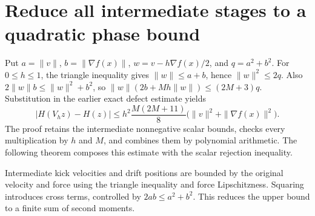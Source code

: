\documentclass[11pt,a4paper]{article}
\begin{document}
\section{\texorpdfstring{Reduce all intermediate stages to a quadratic phase bound}{Reduce all intermediate stages to a quadratic phase bound}}


Put \(a=\|v\|\), \(b=\|\nabla f(x)\|\), \(w=v-h\nabla f(x)/2\), and \(q=a^2+b^2\). For \(0\le h\le1\), the triangle inequality gives \(\|w\|\le a+b\), hence \(\|w\|^2\le2q\). Also \(2\|w\|b\le\|w\|^2+b^2\), so \(\|w\|(2b+Mh\|w\|)\le(2M+3)q\). Substitution in the earlier exact defect estimate yields \[|H(V_hz)-H(z)|\le h^2\frac{M(2M+11)}8\bigl(\|v\|^2+\|\nabla f(x)\|^2\bigr).\] The proof retains the intermediate nonnegative scalar bounds, checks every multiplication by \(h\) and \(M\), and combines them by polynomial arithmetic. The following theorem composes this estimate with the scalar rejection inequality.



Intermediate kick velocities and drift positions are bounded by the original velocity and force using the triangle inequality and force Lipschitzness. Squaring introduces cross terms, controlled by \(2ab\le a^2+b^2\). This reduces the upper bound to a finite sum of second moments.
\end{document}
